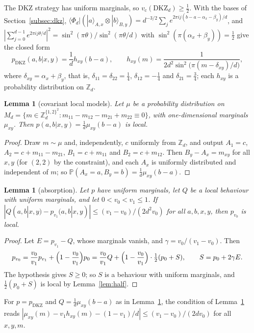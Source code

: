 \documentclass[11pt]{amsart}
\newtheorem{lemma}[theorem]{Lemma}
\theoremstyle{definition}
\theoremstyle{remark}
\numberwithin{equation}{section}
\newcommand{\Z}{\mathbb{Z}}
\renewcommand{\Pr}{\mathbb{P}}
\newcommand{\vc}{v_{\mathrm c}}
\newcommand{\DKZ}{\mathrm{DKZ}}
\begin{document}
The DKZ strategy has uniform marginals, so $\vc(\DKZ_d)\ge\frac12$. With the bases of Section~\ref{subsec:dkz},
$\langle\Phi_d|(|a\rangle_{A,x}\otimes|b\rangle_{B,y})=d^{-3/2}\sum_je^{2\pi ij(b-a-\alpha_x-\beta_y)/d}$, and
$|\sum_{j=0}^{d-1}e^{2\pi ij\theta/d}|^2=\sin^2(\pi\theta)/\sin^2(\pi\theta/d)$ with $\sin^2(\pi(\alpha_x+\beta_y))=\frac12$
give the closed form
\begin{equation}\label{eq:dkzclosed}
p_{\DKZ}(a,b|x,y)=\frac1dh_{xy}(b-a),\qquad h_{xy}(m)=\frac1{2d^2\sin^2\bigl(\pi(m-\delta_{xy})/d\bigr)},
\end{equation}
where $\delta_{xy}=\alpha_x+\beta_y$, that is, $\delta_{11}=\delta_{22}=\frac14$, $\delta_{12}=-\frac14$ and
$\delta_{21}=\frac34$; each $h_{xy}$ is a probability distribution on $\Z_d$.

\begin{lemma}[covariant local models]\label{lem:covariant}
Let $\mu$ be a probability distribution on $M_d=\{m\in\Z_d^{\{1,2\}^2}:m_{11}-m_{12}-m_{21}+m_{22}\equiv0\}$, with
one-dimensional marginals $\mu_{xy}$. Then $p(a,b|x,y)=\frac1d\mu_{xy}(b-a)$ is local.
\end{lemma}

\begin{proof}
Draw $m\sim\mu$ and, independently, $c$ uniformly from $\Z_d$, and output $A_1=c$, $A_2=c+m_{11}-m_{21}$,
$B_1=c+m_{11}$ and $B_2=c+m_{12}$. Then $B_y-A_x=m_{xy}$ for all $x,y$ (for $(2,2)$ by the constraint), and each $A_x$
is uniformly distributed and independent of $m$; so $\Pr(A_x=a,B_y=b)=\frac1d\mu_{xy}(b-a)$.
\end{proof}

\begin{lemma}[absorption]\label{lem:absorb}
Let $p$ have uniform marginals, let $Q$ be a local behaviour with uniform marginals, and let $0<v_0<v_1\le1$. If
$|Q(a,b|x,y)-p_{v_1}(a,b|x,y)|\le(v_1-v_0)/(2d^2v_0)$ for all $a,b,x,y$, then $p_{v_0}$ is local.
\end{lemma}

\begin{proof}
Let $E=p_{v_1}-Q$, whose marginals vanish, and $\gamma=v_0/(v_1-v_0)$. Then
\[
p_{v_0}=\frac{v_0}{v_1}p_{v_1}+\Bigl(1-\frac{v_0}{v_1}\Bigr)p_0=\frac{v_0}{v_1}Q+\Bigl(1-\frac{v_0}{v_1}\Bigr)\cdot
\tfrac12(p_0+S),\qquad S=p_0+2\gamma E.
\]
The hypothesis gives $S\ge0$; so $S$ is a behaviour with uniform marginals, and $\frac12(p_0+S)$ is local by
Lemma~\ref{lem:half}.
\end{proof}

For $p=p_{\DKZ}$ and $Q=\frac1d\mu_{xy}(b-a)$ as in Lemma~\ref{lem:covariant}, the condition of
Lemma~\ref{lem:absorb} reads $|\mu_{xy}(m)-v_1h_{xy}(m)-(1-v_1)/d|\le(v_1-v_0)/(2dv_0)$ for all $x,y,m$.
\end{document}
